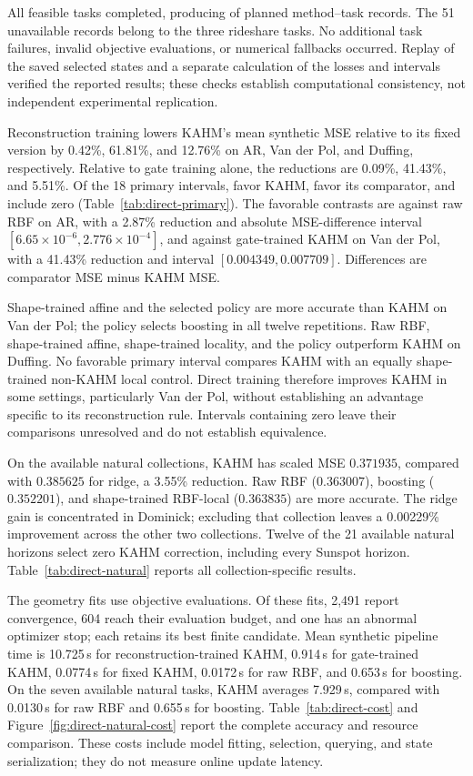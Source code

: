 All \DirectAvailableTasks{} feasible tasks completed, producing
\DirectAvailableOutputs{} of \DirectPlannedOutputs{} planned
method--task records. The 51 unavailable records belong to the three
rideshare tasks. No additional task failures, invalid objective
evaluations, or numerical fallbacks occurred. Replay of the saved
selected states and a separate calculation of the losses and intervals
verified the reported results; these checks establish computational
consistency, not independent experimental replication.

Reconstruction training lowers KAHM's mean synthetic MSE relative to
its fixed version by 0.42\%, 61.81\%, and 12.76\% on AR, Van der Pol,
and Duffing, respectively. Relative to gate training alone, the
reductions are 0.09\%, 41.43\%, and 5.51\%. Of the 18 primary
intervals, \DirectPrimaryPositive{} favor KAHM,
\DirectPrimaryNegative{} favor its comparator, and
\DirectPrimaryUnresolved{} include zero
(Table~\ref{tab:direct-primary}). The favorable contrasts are against
raw RBF on AR, with a 2.87\% reduction and absolute MSE-difference
interval $[6.65\!\times\!10^{-6},2.776\!\times\!10^{-4}]$, and against
gate-trained KAHM on Van der Pol, with a 41.43\% reduction and interval
$[0.004349,0.007709]$. Differences are comparator MSE minus KAHM MSE.

Shape-trained affine and the selected policy are more accurate than
KAHM on Van der Pol; the policy selects boosting in all twelve
repetitions. Raw RBF, shape-trained affine, shape-trained locality,
and the policy outperform KAHM on Duffing. No favorable primary
interval compares KAHM with an equally shape-trained non-KAHM local
control. Direct training therefore improves KAHM in some settings,
particularly Van der Pol, without establishing an advantage specific
to its reconstruction rule. Intervals containing zero leave their
comparisons unresolved and do not establish equivalence.

On the available natural collections, KAHM has scaled MSE $0.371935$,
compared with $0.385625$ for ridge, a 3.55\% reduction. Raw RBF
($0.363007$), boosting ($0.352201$), and shape-trained RBF-local
($0.363835$) are more accurate. The ridge gain is concentrated in
Dominick; excluding that collection leaves a 0.00229\% improvement
across the other two collections. Twelve of the 21 available natural
horizons select zero KAHM correction, including every Sunspot horizon.
Table~\ref{tab:direct-natural} reports all collection-specific results.

The \DirectOptimizations{} geometry fits use
\DirectObjectiveEvaluations{} objective evaluations. Of these fits,
2,491 report convergence, 604 reach their evaluation budget, and one
has an abnormal optimizer stop; each retains its best finite candidate.
Mean synthetic pipeline time is 10.725\,s for reconstruction-trained
KAHM, 0.914\,s for gate-trained KAHM, 0.0774\,s for fixed KAHM,
0.0172\,s for raw RBF, and 0.653\,s for boosting. On the seven
available natural tasks, KAHM averages 7.929\,s, compared with
0.0130\,s for raw RBF and 0.655\,s for boosting.
Table~\ref{tab:direct-cost} and Figure~\ref{fig:direct-natural-cost}
report the complete accuracy and resource comparison. These costs
include model fitting, selection, querying, and state serialization;
they do not measure online update latency.
